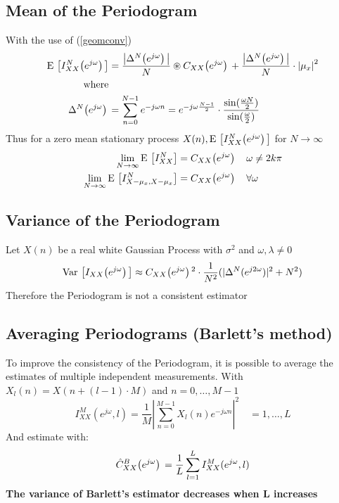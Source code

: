 \documentclass[accentcolor=tud4c,9.5pt,nochapname,bigchapter,paper=a5report]{tudreport}
\begin{document}
\subsection{Mean of the Periodogram}
With the use of (\ref{geomconv})
\begin{subequations}
\begin{align}
{\rm E}\,\left[I_{XX}^{N}{\left(e^{j\omega}\right)}\,\right] &= \frac{\left|\Delta^N{\left(e^{j\omega}\right)}\,\right|}{N} \circledast C_{XX}{\left(e^{j\omega}\right)}\, 
+\frac{\left|\Delta^N{\left(e^{j\omega}\right)}\,\right|}{N} \cdot \left|\mu_x\right|^2 \\
\text{where} \notag \\
\Delta^N{\left(e^{j\omega}\right)}\, &= \sum\limits_{n=0}^{N-1}e^{-j\omega n} = e ^{-j \omega \frac{N-1}{2}} \cdot \frac{\sin(\frac{\omega N}{2})}{\sin(\frac{\omega}{2})}
\end{align}

\end{subequations}
Thus for a zero mean stationary process $X(n),{\rm E}\,\left[I_{XX}^{N}{\left(e^{j\omega}\right)}\,\right]$ for $N\rightarrow\infty$
\begin{subequations}
\begin{align}
\lim\limits_{N\rightarrow\infty} {\rm E}\,\left[I_{XX}^{N}\right] &= C_{XX}{\left(e^{j\omega}\right)}\, \quad \omega \neq 2k\pi \\
\lim\limits_{N\rightarrow\infty} {\rm E}\,\left[I_{X-\mu_x,X-\mu_x}^{N}\right] &= C_{XX}{\left(e^{j\omega}\right)}\, \quad \forall\omega
\end{align}
\end{subequations}

\subsection{Variance of the Periodogram}
Let $X(n)$ be a real white Gaussian Process with $\sigma^2$ and $\omega,\lambda \neq 0$
\begin{equation}
{\rm Var}\,\left[I_{XX}{\left(e^{j\omega}\right)}\,\right] \approx C_{XX}{\left(e^{j\omega}\right)}\,^2 \cdot \frac{1}{N^2}(|\Delta^N(e^{j2\omega})|^2+N^2)
\end{equation}
Therefore the Periodogram is not a consistent estimator

\subsection{Averaging Periodograms (Barlett's method)}
To improve the consistency of the Periodogram, it is 
possible to average the estimates of multiple independent measurements. With $X_l(n)=X(n+(l-1)\cdot M)$ and $n=0,\ldots,M-1$
\begin{equation}
I_{XX}^M(e^{j\omega},l)=\frac{1}{M}\left|\sum\limits_{n=0}^{M-1} X_l(n) e^{-j\omega n}\right|^2 \quad = 1,\ldots,L
\end{equation}
And estimate with:
\begin{equation}
\hat{C}_{XX}^B{\left(e^{j\omega}\right)}\, = \frac{1}{L}\sum\limits_{l=1}^{L} I_{XX}^M (e^{j\omega},l)
\end{equation}
{\bf The variance of Barlett's estimator decreases when L increases}
\end{document}
